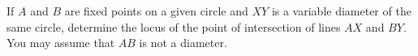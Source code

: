 If $ A$ and $ B$ are fixed points on a given circle and $ XY$ is a variable diameter of the same circle, determine the locus of the point of intersection of lines $ AX$ and $ BY$. You may assume that $ AB$ is not a diameter.